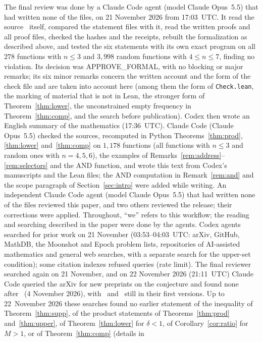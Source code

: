 \documentclass[11pt]{article}
\theoremstyle{definition}
\theoremstyle{remark}
\begin{document}
The final review was done by a Claude Code agent (model Claude Opus~5.5) that
had written none of the files, on 21 November 2026 from 17:03~UTC. It read the
source~\cite{owz} itself, compared the statement files with it, read the written
proofs and all proof files, checked the hashes and the receipts, rebuilt the
formalization as described above, and tested the six statements with its own
exact program on all $278$ functions with $n\le3$ and $3{,}998$ random functions
with $4\le n\le7$, finding no violation. Its decision was APPROVE\_FORMAL, with
no blocking or major remarks; its six minor remarks concern the written account
and the form of the check file and are taken into account here (among them the
form of \texttt{Check.lean}, the marking of material that is not in Lean, the
stronger form of Theorem~\ref{thm:lower}, the unconstrained empty frequency in
Theorem~\ref{thm:comp}, and the search before publication). Codex then wrote an
English summary of the mathematics (17:36~UTC). Claude Code (Claude Opus~5.5)
checked the sources, recomputed in Python Theorems~\ref{thm:prod}, \ref{thm:lower}
and~\ref{thm:comp} on $1{,}178$ functions
(all functions with $n\le3$ and random ones with $n=4,5,6$), the examples of
Remarks~\ref{rem:address}--\ref{rem:selectors} and the AND function, and wrote
this text from Codex's manuscripts and the Lean files; the AND computation in
Remark~\ref{rem:and} and the scope paragraph of Section~\ref{sec:intro} were added while writing.
An independent Claude Code agent (model Claude Opus~5.5) that had written none of the files reviewed this paper, and two others reviewed the release; their corrections were applied. Throughout, ``we'' refers to this workflow; the reading and
searching described in the paper were done by the agents. Codex agents searched
for prior work on 21 November (03:53--04:03~UTC: arXiv, GitHub, MathDB, the
Moonshot and Epoch problem lists, repositories of AI-assisted mathematics and
general web searches, with a separate search for the upper-set condition); some
citation indexes refused queries (rate limit). The final reviewer searched
again on 21 November, and on 22 November 2026 (21:11~UTC) Claude Code queried
the arXiv for new preprints on the conjecture and found none after~\cite{ps} (4 November
2026), with~\cite{pot} and~\cite{shm} still in their first versions. Up to
22~November 2026 these searches found no earlier statement of the inequality of
Theorem~\ref{thm:supp}, of the product statements of Theorems~\ref{thm:prod}
and~\ref{thm:upper}, of Theorem~\ref{thm:lower} for $\delta<1$, of
Corollary~\ref{cor:ratio} for $M>1$, or of Theorem~\ref{thm:comp} (details in
\end{document}
